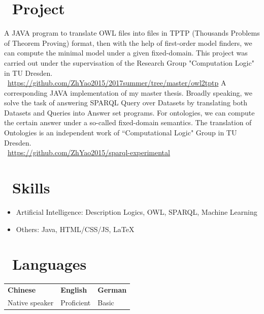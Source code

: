 \documentclass{my_cv}
\begin{document}
	\section{\faFolderOpen\ Project}
	A JAVA program to translate OWL files into files in TPTP (Thousands Problems of Theorem Proving) format, then with the help of first-order model finders, we can compute the minimal model under a given fixed-domain. This project was carried out under the supervisation of the Research Group "Computation Logic" in TU Dresden.\\
	\faGithub\  \url{https://github.com/ZhYao2015/2017summer/tree/master/owl2tptp}
	A corresponding JAVA implementation of my master thesis. Broadly speaking, we solve the task of answering SPARQL Query over Datasets by translating both Datasets and Queries into Answer set programs. For ontologies, we can compute the certain answer under a so-called fixed-domain semantics. The translation of Ontologies is an independent work of ``Computational Logic" Group in TU Dresden.\\
	\faGithub\ \url{https://github.com/ZhYao2015/sparql-experimental}
	\section{\faKey\ Skills}
	\begin{itemize}
		\item Artificial Intelligence: Description Logics, OWL, SPARQL, Machine Learning
		\item Others: Java, HTML/CSS/JS, \LaTeX
	\end{itemize}
	\section{\faGlobe\ Languages}
	\vspace{-5mm}
	\begin{table}[h]
		\begin{tabular}{lll}
			{\bfseries \Large Chinese}&{\bfseries \Large English}&{\bfseries \Large German}\\
			Native speaker & Proficient & Basic\\
		\end{tabular}
	\end{table}
\end{document}
